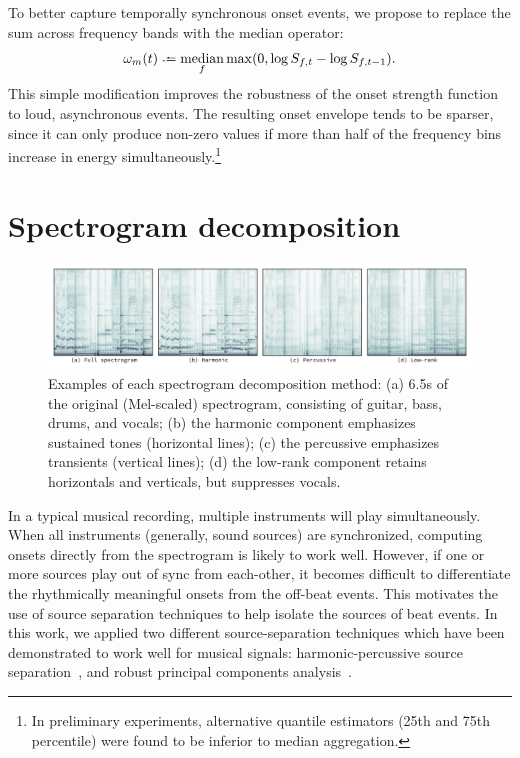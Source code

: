 \documentclass{article}
\begin{document}
To better capture temporally synchronous onset events, we propose to replace the sum
across frequency bands with the median operator:
\begin{equation}
\omega_m(t) \defeq \median_f \max(0, \log S_{f, t} - \log S_{f, t-1}).\label{eq:onset:median}
\end{equation}
This simple modification improves the robustness of the onset strength function to loud, 
asynchronous events.  The resulting onset envelope tends to be sparser, since it can only 
produce non-zero values if more than half of the frequency bins increase in energy 
simultaneously.\footnote{In preliminary experiments, alternative quantile estimators 
(25th and 75th percentile) were found to be inferior to median aggregation.}

\section{Spectrogram decomposition}
\label{sec:spectrogram}

\begin{figure}
\centering%
\includegraphics[width=\textwidth]{figs/specgrams}%
\vspace{-\baselineskip}%
\caption{Examples of each spectrogram decomposition method: 
(a) 6.5s of the original (Mel-scaled) spectrogram, consisting of guitar, bass, drums, and vocals; 
(b) the harmonic component emphasizes sustained tones (horizontal lines); 
(c) the percussive emphasizes transients (vertical lines); 
(d) the low-rank component retains horizontals and verticals, but suppresses vocals.}
\label{fig:specgrams}
\end{figure}

In a typical musical recording, multiple instruments will play simultaneously. When
all instruments (generally, sound sources) are synchronized, computing onsets
directly from the spectrogram is likely to work well.  
However, if one or more sources play out of sync from each-other, it becomes difficult
to differentiate the rhythmically meaningful onsets from the off-beat events.  This
motivates the use of source separation techniques to help isolate the sources of beat
events.  In this work, we applied two different source-separation techniques which have
been demonstrated to work well for musical signals: harmonic-percussive source 
separation~\cite{ono2008real}, and robust principal components analysis~\cite{candes2011robust}.
\end{document}
